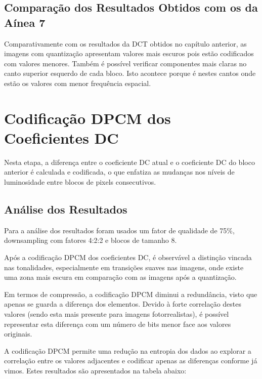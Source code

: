 \documentclass{article}
\begin{document}
\subsection{Comparação dos Resultados Obtidos com os da Aínea 7}

Comparativamente com os resultados da DCT obtidos no capítulo anterior, as imagens com quantização apresentam valores mais escuros pois estão codificados com valores menores. Também é possível verificar componentes mais claras no canto superior esquerdo de cada bloco. Isto acontece porque é nestes cantos onde estão os valores com menor frequência espacial.

\newpage

\section{Codificação DPCM dos Coeficientes DC}
Nesta etapa, a diferença entre o coeficiente DC atual e o coeficiente DC do bloco anterior é calculada e codificada, o que enfatiza as mudanças nos níveis de luminosidade entre blocos de pixels consecutivos.

\subsection{Análise dos Resultados}
Para a análise dos resultados foram usados um fator de qualidade de 75\%, downsampling com fatores 4:2:2 e blocos de tamanho 8.

Após a codificação DPCM dos coeficientes DC, é observável a distinção vincada nas tonalidades, especialmente em transições suaves nas imagens, onde existe uma zona mais escura em comparação com as imagens após a quantização.

Em termos de compressão, a codificação DPCM diminui a redundância, visto que apenas se guarda a diferença dos elementos. Devido à forte correlação destes valores (sendo esta mais presente para imagens fotorrealistas), é possível representar esta diferença com um número de bits menor face aos valores originais.

A codificação DPCM permite uma redução na entropia dos dados ao explorar a correlação entre os valores adjacentes e codificar apenas as diferenças conforme já vimos. Estes resultados são apresentados na tabela abaixo:
\end{document}
